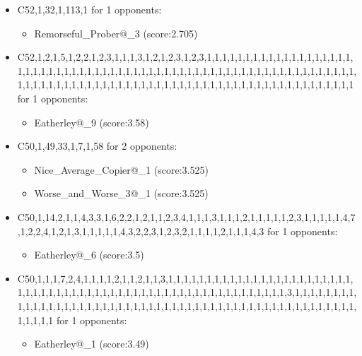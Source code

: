 \begin{appendices}
\begin{itemize}
        \item C52,1,32,1,113,1 for 1 opponents:
        \begin{multicols}{3}
            \begin{itemize}
                \item Remorseful\_Prober@\_3 (score:2.705)
            \end{itemize}
        \end{multicols}

        \item C52,1,2,1,5,1,2,2,1,2,3,1,1,1,3,1,2,1,2,3,1,2,3,1,1,1,1,1,1,1,1,1,1,1,1,1,1,1,1,1,1,1,1,1,1,1,1,1,1,1,1,1,1,1,1,1,1,1,1,1,1,1,1,1,1,1,1,1,1,1,1,1,1,1,1,1,1,1,1,1,1,1,1,1,1,1,1,1,1,1,1,1,1,1,1,1,1,1,1,1,1,1,1,1,1,1,1,1,1,1,1,1,1,1,1,1,1,1,1,1,1,1,1,1,1,1,1,1,1,1 for 1 opponents:
        \begin{multicols}{3}
            \begin{itemize}
                \item Eatherley@\_9 (score:3.58)
            \end{itemize}
        \end{multicols}

        \item C50,1,49,33,1,7,1,58 for 2 opponents:
        \begin{multicols}{3}
            \begin{itemize}
                \item Nice\_Average\_Copier@\_1 (score:3.525)
                \item Worse\_and\_Worse\_3@\_1 (score:3.525)
            \end{itemize}
        \end{multicols}

        \item C50,1,14,2,1,1,4,3,3,1,6,2,2,1,2,1,1,2,3,4,1,1,1,3,1,1,1,2,1,1,1,1,1,2,3,1,1,1,1,1,4,7,1,2,2,4,1,2,1,3,1,1,1,1,1,4,3,2,2,3,1,2,3,2,1,1,1,1,2,1,1,1,4,3 for 1 opponents:
        \begin{multicols}{3}
            \begin{itemize}
                \item Eatherley@\_6 (score:3.5)
            \end{itemize}
        \end{multicols}

        \item C50,1,1,1,7,2,4,1,1,1,1,2,1,1,2,1,1,3,1,1,1,1,1,1,1,1,1,1,1,1,1,1,1,1,1,1,1,1,1,1,1,1,1,1,1,1,1,1,1,1,1,1,1,1,1,1,1,1,1,1,1,1,1,1,1,1,1,1,1,1,1,1,1,1,1,1,1,3,1,1,1,1,1,1,1,1,1,1,1,1,1,1,1,1,1,1,1,1,1,1,1,1,1,1,1,1,1,1,1,1,1,1,1,1,1,1,1,1,1,1,1,1,1,1,1,1,1,1,1,1,1,1,1,1,1 for 1 opponents:
        \begin{multicols}{3}
            \begin{itemize}
                \item Eatherley@\_1 (score:3.49)
            \end{itemize}
        \end{multicols}


\end{itemize}
\end{appendices}
